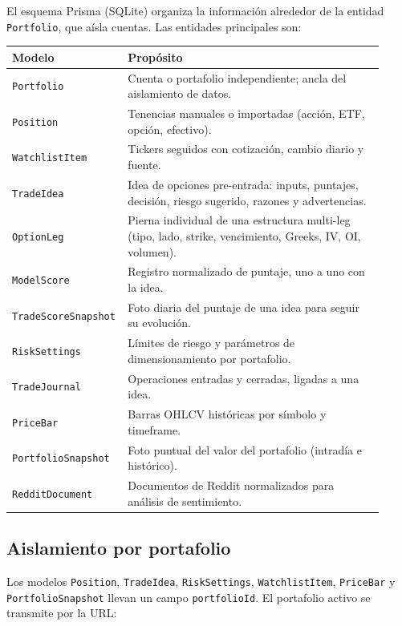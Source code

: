 \documentclass[11pt,letterpaper]{article}
\begin{document}
El esquema Prisma (SQLite) organiza la información alrededor de la entidad
\texttt{Portfolio}, que aísla cuentas. Las entidades principales son:

\begin{longtable}{p{0.24\linewidth} p{0.68\linewidth}}
\toprule
\textbf{Modelo} & \textbf{Propósito} \\
\midrule
\texttt{Portfolio} & Cuenta o portafolio independiente; ancla del aislamiento de datos. \\
\texttt{Position} & Tenencias manuales o importadas (acción, ETF, opción, efectivo). \\
\texttt{WatchlistItem} & Tickers seguidos con cotización, cambio diario y fuente. \\
\texttt{TradeIdea} & Idea de opciones pre-entrada: inputs, puntajes, decisión, riesgo sugerido, razones y advertencias. \\
\texttt{OptionLeg} & Pierna individual de una estructura multi-leg (tipo, lado, strike, vencimiento, Greeks, IV, OI, volumen). \\
\texttt{ModelScore} & Registro normalizado de puntaje, uno a uno con la idea. \\
\texttt{TradeScoreSnapshot} & Foto diaria del puntaje de una idea para seguir su evolución. \\
\texttt{RiskSettings} & Límites de riesgo y parámetros de dimensionamiento por portafolio. \\
\texttt{TradeJournal} & Operaciones entradas y cerradas, ligadas a una idea. \\
\texttt{PriceBar} & Barras OHLCV históricas por símbolo y timeframe. \\
\texttt{PortfolioSnapshot} & Foto puntual del valor del portafolio (intradía e histórico). \\
\texttt{RedditDocument} & Documentos de Reddit normalizados para análisis de sentimiento. \\
\bottomrule
\end{longtable}

\subsection{Aislamiento por portafolio}

Los modelos \texttt{Position}, \texttt{TradeIdea}, \texttt{RiskSettings},
\texttt{WatchlistItem}, \texttt{PriceBar} y \texttt{PortfolioSnapshot} llevan un
campo \texttt{portfolioId}. El portafolio activo se transmite por la URL:
\end{document}
